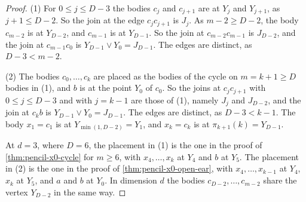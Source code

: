 \begin{proof}
  \leanok
  (1) For $0 \le j \le D - 3$ the bodies $c_j$ and $c_{j+1}$ are at
  $Y_j$ and $Y_{j+1}$, as $j + 1 \le D - 2$. So the join at the edge
  $c_j c_{j+1}$ is $J_j$. As $m - 2 \ge D - 2$, the body $c_{m-2}$ is at
  $Y_{D-2}$, and $c_{m-1}$ is at $Y_{D-1}$. So the join at
  $c_{m-2} c_{m-1}$ is $J_{D-2}$, and the join at $c_{m-1} c_0$ is
  $Y_{D-1} \vee Y_0 = J_{D-1}$. The edges are distinct, as
  $D - 3 < m - 2$.

  (2) The bodies $c_0, \dots, c_k$ are placed as the bodies of the cycle
  on $m = k + 1 \ge D$ bodies in (1), and $b$ is at the point $Y_0$ of
  $c_0$. So the joins at $c_j c_{j+1}$ with $0 \le j \le D - 3$ and with
  $j = k - 1$ are those of (1), namely $J_j$ and $J_{D-2}$, and the join
  at $c_k b$ is $Y_{D-1} \vee Y_0 = J_{D-1}$. The edges are distinct, as
  $D - 3 < k - 1$. The body $x_1 = c_1$ is at $Y_{\min(1, D-2)} = Y_1$,
  and $x_k = c_k$ is at $\pi_{k+1}(k) = Y_{D-1}$.

  At $d = 3$, where $D = 6$, the placement in (1) is the one in the proof
  of \cref{thm:pencil-x0-cycle} for $m \ge 6$, with $x_4, \dots, x_k$ at
  $Y_4$ and $b$ at $Y_5$. The placement in (2) is the one in the proof of
  \cref{thm:pencil-x0-open-ear}, with $x_4, \dots, x_{k-1}$ at $Y_4$,
  $x_k$ at $Y_5$, and $a$ and $b$ at $Y_0$. In dimension $d$ the bodies
  $c_{D-2}, \dots, c_{m-2}$ share the vertex $Y_{D-2}$ in the same way.
\end{proof}

